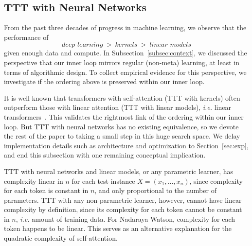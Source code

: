 \documentclass{article} %
\begin{document}
\subsection{TTT with Neural Networks}
\label{subsec:neuralnetwork}
From the past three decades of progress in machine learning, we observe that the performance of 
\begin{equation*}
\label{eq:ineq}
\textit{deep~learning} ~>~ \textit{kernels} ~>~ \textit{linear models}
\end{equation*}
given enough data and compute.
In Subsection~\ref{subsec:context}, we discussed the perspective that our inner loop mirrors regular (non-meta) learning, at least in terms of algorithmic design.
To collect empirical evidence for this perspective, we investigate if the ordering above is preserved within our inner loop.

It is well known that transformers with self-attention (TTT with kernels) often outperform those with linear attention (TTT with linear models), \textit{i.e.} linear transformers~\citep{katharopoulos2020transformers}. 
This validates the rightmost link of the ordering within our inner loop.
But TTT with neural networks has no existing equivalence, so we devote the rest of the paper to taking a small step in this huge search space. 
We delay implementation details such as architecture and optimization to Section~\ref{sec:exp}, and end this subsection with one remaining conceptual implication.

TTT with neural networks and linear models, or any parametric learner, has complexity linear in $n$ for each test instance $X = (x_1,\dots,x_n)$, since complexity for each token is constant in $n$, and only proportional to the number of parameters.
TTT with any non-parametric learner, however, cannot have linear complexity by definition, since its complexity for each token cannot be constant in $n$, \textit{i.e.} amount of training data.
For Nadaraya-Watson, complexity for each token happens to be linear.
This serves as an alternative explanation for the quadratic complexity of self-attention. 

\end{document}
